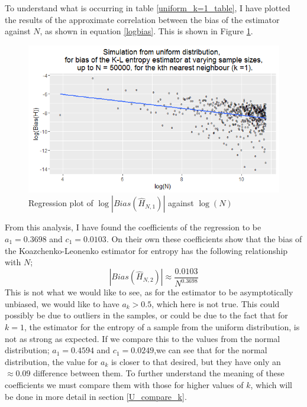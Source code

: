 \documentclass{article}
\begin{document}
To understand what is occurring in table \ref{uniform_k=1_table}, I have plotted the results of the approximate correlation between the bias of the estimator against $N$, as shown in equation \ref{logbias}. This is shown in Figure \ref{uniform_k=1_graph}.

\begin{figure}
  \begin{center}
    \includegraphics[width=\textwidth]{./Graphs/Uniform_k=1_plot.png}
  \end{center}
\caption{Regression plot of $\log|Bias(\hat{H}_{N, 1})|$ against $\log(N)$}
  \label{uniform_k=1_graph}
\end{figure}

 From this analysis, I have found the coefficients of the regression to be $a_{1} = 0.3698$ and $c_{1}=0.0103$. On their own these coefficients show that the bias of the Koazchenko-Leonenko estimator for entropy has the following relationship with $N$;
\begin{equation}
|Bias(\hat{H}_{N, 2})| \approx \frac{0.0103}{N^{0.3698}}\nonumber
\end{equation}
This is not what we would like to see, as for the estimator to be asymptotically unbiased, we would like to have $a_{k} > 0.5$, which here is not true. This could possibly be due to outliers in the samples, or could be due to the fact that for $k=1$, the estimator for the entropy of a sample from the uniform distribution, is not as strong as expected. If we compare this to the values from the normal distribution; $a_{1} = 0.4594$ and $c_{1} = 0.0249$,we can see that for the normal distribution, the value for $a_{k}$ is closer to that desired, but they have only an $\approx 0.09$ difference between them. To further understand the meaning of these coefficients we must compare them with those for higher values of $k$, which will be done in more detail in section \ref{U_compare_k}.
\end{document}
